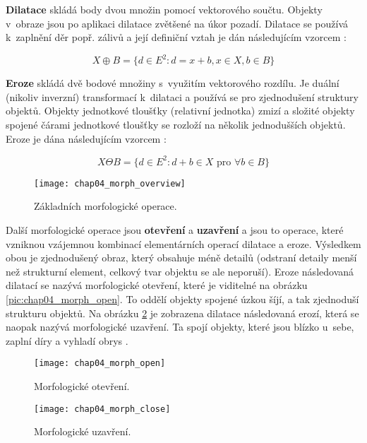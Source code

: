 \textbf{Dilatace} skládá body dvou množin pomocí vektorového součtu. Objekty v~obraze jsou po aplikaci dilatace zvětšené na úkor pozadí. Dilatace se používá k~zaplnění děr popř. zálivů a její definiční vztah je dán následujícím vzorcem \cite{feec}:

\begin{equation}
X \oplus B = \{d \in E^2 : d = x + b, x \in X, b \in B\}
\end{equation}

\textbf{Eroze} skládá dvě bodové množiny s~využitím vektorového rozdílu. Je duální (nikoliv inverzní) transformací k~dilataci a používá se pro zjednodušení struktury objektů. Objekty jednotkové tloušťky (relativní jednotka) zmizí a složité objekty spojené čárami jednotkové tloušťky se rozloží na několik jednodušších objektů. Eroze je dána následujícím vzorcem \cite{feec}:

\begin{equation}
X \Theta B = \{d \in E^2 : d + b \in X \text{ pro } \forall b \in B\}
\end{equation}

  \begin{figure}[h]
	\begin{center}
		\texttt{[image: chap04\_morph\_overview]}
		\caption{Základních morfologické operace.}
		\label{pic:chap04_morph_overview}
	\end{center}
  \end{figure}

Další morfologické operace jsou \textbf{otevření} a \textbf{uzavření} a jsou to operace, které vzniknou vzájemnou kombinací elementárních operací dilatace a eroze. Výsledkem obou je zjednodušený obraz, který obsahuje méně detailů (odstraní detaily menší než strukturní element, celkový tvar objektu se ale neporuší). Eroze následovaná dilatací se nazývá morfologické otevření, které je viditelné na obrázku \ref{pic:chap04_morph_open}. To oddělí objekty spojené úzkou šíjí, a tak zjednoduší strukturu objektů. Na obrázku \ref{pic:chap04_morph_close} je zobrazena dilatace následovaná erozí, která se naopak nazývá morfologické uzavření. Ta spojí objekty, které jsou blízko u~sebe, zaplní díry a vyhladí obrys \cite{feec}.

  \begin{figure}[h]
  \begin{minipage}[c]{0.47\textwidth}
    \texttt{[image: chap04\_morph\_open]}
		\caption{Morfologické otevření.}
		\label{pic:chap04_morph_open}
  \end{minipage}
  \hfill
  \begin{minipage}[c]{0.47\textwidth}
    \texttt{[image: chap04\_morph\_close]}
		\caption{Morfologické uzavření.}
		\label{pic:chap04_morph_close}
  \end{minipage}
\end{figure}

